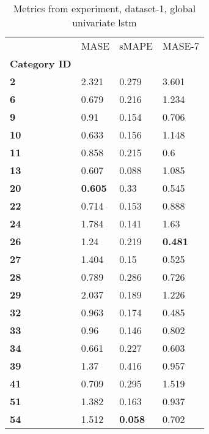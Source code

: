 \begin{table}[H]
\centering
\caption{Metrics from experiment, dataset-1, global univariate lstm}
\label{table:global-univariate-lstm-dataset-1}
\begin{tabular}{llll}
\toprule
{} &            MASE &           sMAPE &          MASE-7 \\
\textbf{Category ID} &                 &                 &                 \\
\midrule
\textbf{2          } &           2.321 &           0.279 &           3.601 \\
\textbf{6          } &           0.679 &           0.216 &           1.234 \\
\textbf{9          } &            0.91 &           0.154 &           0.706 \\
\textbf{10         } &           0.633 &           0.156 &           1.148 \\
\textbf{11         } &           0.858 &           0.215 &             0.6 \\
\textbf{13         } &           0.607 &           0.088 &           1.085 \\
\textbf{20         } &  \textbf{0.605} &            0.33 &           0.545 \\
\textbf{22         } &           0.714 &           0.153 &           0.888 \\
\textbf{24         } &           1.784 &           0.141 &            1.63 \\
\textbf{26         } &            1.24 &           0.219 &  \textbf{0.481} \\
\textbf{27         } &           1.404 &            0.15 &           0.525 \\
\textbf{28         } &           0.789 &           0.286 &           0.726 \\
\textbf{29         } &           2.037 &           0.189 &           1.226 \\
\textbf{32         } &           0.963 &           0.174 &           0.485 \\
\textbf{33         } &            0.96 &           0.146 &           0.802 \\
\textbf{34         } &           0.661 &           0.227 &           0.603 \\
\textbf{39         } &            1.37 &           0.416 &           0.957 \\
\textbf{41         } &           0.709 &           0.295 &           1.519 \\
\textbf{51         } &           1.382 &           0.163 &           0.937 \\
\textbf{54         } &           1.512 &  \textbf{0.058} &           0.702 \\
\bottomrule
\end{tabular}
\end{table}
